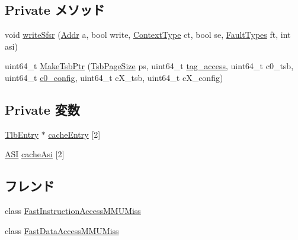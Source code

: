 \subsection*{Private メソッド}
\begin{DoxyCompactItemize}
\item 
void \hyperlink{classSparcISA_1_1TLB_a3c55ffc205560c3c945248eda4e0a62d}{writeSfsr} (\hyperlink{base_2types_8hh_af1bb03d6a4ee096394a6749f0a169232}{Addr} a, bool write, \hyperlink{classSparcISA_1_1TLB_a856bf0f48d7d9c89d1e4216a6f0394e5}{ContextType} ct, bool se, \hyperlink{classSparcISA_1_1TLB_a8e661b580d73f1e008c8ea6fc5823822}{FaultTypes} ft, int asi)
\item 
uint64\_\-t \hyperlink{classSparcISA_1_1TLB_a69c520e9f2bec8ddb4eb5121cf10a94c}{MakeTsbPtr} (\hyperlink{classSparcISA_1_1TLB_a639a136c8fa30e45275bd7354e95eadd}{TsbPageSize} ps, uint64\_\-t \hyperlink{classSparcISA_1_1TLB_a5d2c5251a072e8aef04cf78fdd6432d7}{tag\_\-access}, uint64\_\-t c0\_\-tsb, uint64\_\-t \hyperlink{classSparcISA_1_1TLB_a9395cf2ea615ba767ab8a677ee13d29c}{c0\_\-config}, uint64\_\-t cX\_\-tsb, uint64\_\-t cX\_\-config)
\end{DoxyCompactItemize}
\subsection*{Private 変数}
\begin{DoxyCompactItemize}
\item 
\hyperlink{structSparcISA_1_1TlbEntry}{TlbEntry} $\ast$ \hyperlink{classSparcISA_1_1TLB_a5c9e9ce37f7a50fb908752ece801110f}{cacheEntry} \mbox{[}2\mbox{]}
\item 
\hyperlink{namespaceSparcISA_a6dd43f1311515252b283f56d7095a1f3}{ASI} \hyperlink{classSparcISA_1_1TLB_ad1ec0943e2f511b3a252ca0b824eb3e6}{cacheAsi} \mbox{[}2\mbox{]}
\end{DoxyCompactItemize}
\subsection*{フレンド}
\begin{DoxyCompactItemize}
\item 
class \hyperlink{classSparcISA_1_1TLB_af8c3b0d2687d5c17d60fee3e4e77e20f}{FastInstructionAccessMMUMiss}
\item 
class \hyperlink{classSparcISA_1_1TLB_a3d497ded3c85659ec4b013e2cae38c71}{FastDataAccessMMUMiss}
\end{DoxyCompactItemize}


